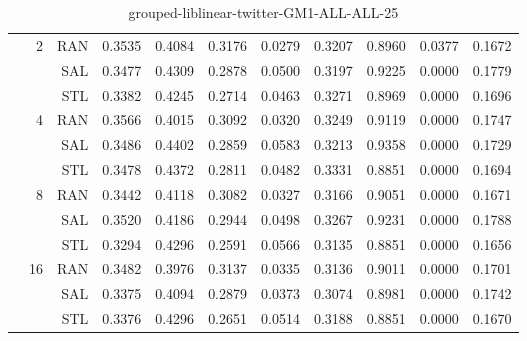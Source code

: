 \begin{center}
\begin{table}[htbp]
\begin{tabular}{ | r | r | r | r | r | r | r | r | r | r | r |}
 & \multirow{3}{*}{2} & RAN & 0.3535 & 0.4084 & 0.3176 & 0.0279 & 0.3207 & 0.8960 & 0.0377 & 0.1672\\ \cline{3-11}
 &   & SAL & 0.3477 & 0.4309 & 0.2878 & 0.0500 & 0.3197 & 0.9225 & 0.0000 & 0.1779\\ \cline{3-11}
 &   & STL & 0.3382 & 0.4245 & 0.2714 & 0.0463 & 0.3271 & 0.8969 & 0.0000 & 0.1696\\ \cline{2-11}
 & \multirow{3}{*}{4} & RAN & 0.3566 & 0.4015 & 0.3092 & 0.0320 & 0.3249 & 0.9119 & 0.0000 & 0.1747\\ \cline{3-11}
 &   & SAL & 0.3486 & 0.4402 & 0.2859 & 0.0583 & 0.3213 & 0.9358 & 0.0000 & 0.1729\\ \cline{3-11}
 &   & STL & 0.3478 & 0.4372 & 0.2811 & 0.0482 & 0.3331 & 0.8851 & 0.0000 & 0.1694\\ \cline{2-11}
 & \multirow{3}{*}{8} & RAN & 0.3442 & 0.4118 & 0.3082 & 0.0327 & 0.3166 & 0.9051 & 0.0000 & 0.1671\\ \cline{3-11}
 &   & SAL & 0.3520 & 0.4186 & 0.2944 & 0.0498 & 0.3267 & 0.9231 & 0.0000 & 0.1788\\ \cline{3-11}
 &   & STL & 0.3294 & 0.4296 & 0.2591 & 0.0566 & 0.3135 & 0.8851 & 0.0000 & 0.1656\\ \cline{2-11}
 & \multirow{3}{*}{16} & RAN & 0.3482 & 0.3976 & 0.3137 & 0.0335 & 0.3136 & 0.9011 & 0.0000 & 0.1701\\ \cline{3-11}
 &   & SAL & 0.3375 & 0.4094 & 0.2879 & 0.0373 & 0.3074 & 0.8981 & 0.0000 & 0.1742\\ \cline{3-11}
 &   & STL & 0.3376 & 0.4296 & 0.2651 & 0.0514 & 0.3188 & 0.8851 & 0.0000 & 0.1670\\ \cline{2-11}
\hline
\end{tabular}
\caption{grouped-liblinear-twitter-GM1-ALL-ALL-25}
\end{table}
\end{center}

